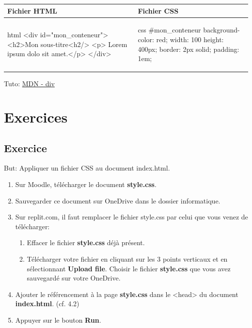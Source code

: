 \documentclass[a4paper,11pt]{article}
\begin{document}
\begin{tabular}{|l|l|}
\hline
\centering Fichier HTML & Fichier CSS\tabularnewline
\hline
\begin{minipage}{1\textwidth}
\begin{code}{html}
<div id="mon_conteneur">
  <h2>Mon sous-titre<h2/>
  <p> Lorem ipsum dolo sit amet.</p>
</div>
\end{code}
\end{minipage}&
\begin{minipage}{1\textwidth}
\begin{code}{css}
#mon_conteneur{
  background-color: red;
  width: 100%
  height: 400px;
  border: 2px solid;
  padding: 1em;
}
\end{code}
\end{minipage}\tabularnewline
\hline
\end{tabular}\par

Tuto: \href{https://developer.mozilla.org/fr/docs/Web/HTML/Element/div}{MDN - div}

\section{Exercices}
\subsection{Exercice}
But: Appliquer un fichier CSS au document index.html.
\begin{enumerate}
\item Sur Moodle, télécharger le document \textbf{style.css}.
\item Sauvegarder ce document sur OneDrive dans le dossier informatique.
\item Sur replit.com, il faut remplacer le fichier style.css par celui que vous venez de télécharger:
\begin{enumerate}
  \item Effacer le fichier \textbf{style.css} déjà présent.
  \item Télécharger votre fichier en cliquant sur les 3 points verticaux et en sélectionnant \textbf{Upload file}. Choisir le fichier \textbf{ style.css} que vous avez sauvegardé sur votre OneDrive.
\end{enumerate}
\item Ajouter le référencement à la page \textbf{style.css} dans le <head> du document \textbf{index.html}. (cf. 4.2)
\item Appuyer sur le bouton \textbf{Run}.
\end{enumerate}
\end{document}
